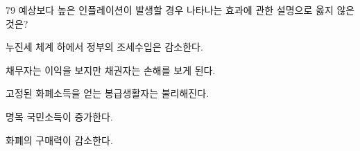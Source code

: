 \begin{question}{79}
예상보다 높은 인플레이션이 발생할 경우 나타나는 효과에 관한 설명으로 옳지 않은 것은?
\begin{choices}
  \item 누진세 체계 하에서 정부의 조세수입은 감소한다.
  \item 채무자는 이익을 보지만 채권자는 손해를 보게 된다.
  \item 고정된 화폐소득을 얻는 봉급생활자는 불리해진다.
  \item 명목 국민소득이 증가한다.
  \item 화폐의 구매력이 감소한다.
\end{choices}
\end{question}
